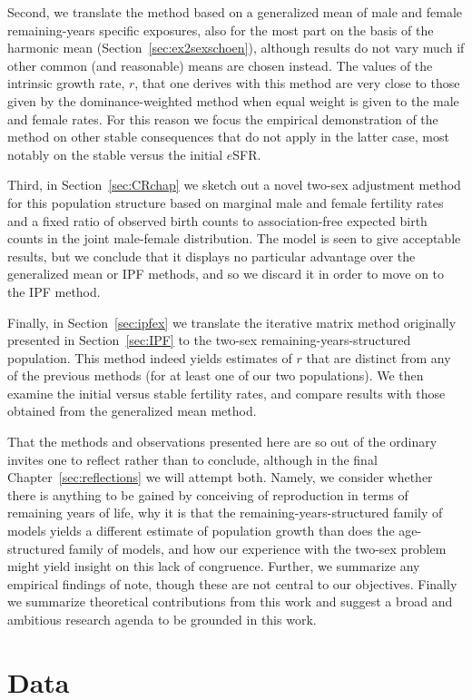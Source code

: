 Second, we translate the
method based on a generalized mean of male and female
remaining-years specific exposures, also for the most part on the basis of the
harmonic mean (Section~\ref{sec:ex2sexschoen}), although results do not vary
much if other common (and reasonable) means are chosen instead. The values of
the intrinsic growth rate, $r$, that one derives with this method are very close
to those given by the dominance-weighted method when equal weight is given to
the male and female rates. For this reason we focus the empirical
demonstration of the method on other stable consequences that do not apply in
the latter case, most notably on the stable versus the initial $e$SFR.

Third, in Section~\ref{sec:CRchap} we sketch out a novel two-sex adjustment
method for this population structure based on marginal male and female fertility
rates and a fixed ratio of observed birth counts to association-free expected
birth counts in the joint male-female distribution. The model is seen to give
acceptable results, but we conclude that it displays no particular advantage
over the generalized mean or IPF methods, and so we discard it in order to move
on to the IPF method.

Finally, in Section~\ref{sec:ipfex} we translate the iterative matrix method
originally presented in Section~\ref{sec:IPF} to the two-sex remaining-years-structured 
population. This method indeed yields estimates of $r$ that are distinct from
any of the previous methods (for at least one of our two populations). We then
examine the initial versus stable fertility rates, and compare results with
those obtained from the generalized mean method.

That the methods and observations presented here are so out of the ordinary
invites one to reflect rather than to conclude, although in the final
Chapter~\ref{sec:reflections} we will attempt both. Namely, we consider whether
there is anything to be gained by conceiving of reproduction in terms of remaining years of life, why it is that the
remaining-years-structured family of models yields a different estimate of
population growth than does the age-structured family of models, and how our
experience with the two-sex problem might yield insight on this lack of
congruence. Further, we summarize any empirical findings of note, though these
are not central to our objectives. Finally we summarize theoretical
contributions from this work and suggest a broad and ambitious research agenda
to be grounded in this work.

\section{Data}


